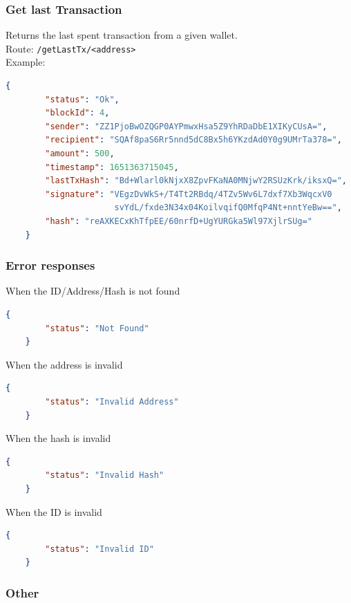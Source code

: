 \documentclass[../documentation.tex]{subfiles}
\begin{document}
\subsubsection{Get last Transaction}

Returns the last spent transaction from a given wallet.
\\
Route: \texttt{/getLastTx/<address>}
\\
Example:
\begin{lstlisting}[language=json]
    {
        "status": "Ok",
        "blockId": 4,
        "sender": "ZZ1PjoBwOZQGP0AYPmwxHsa5Z9YhRDaDbE1XIKyCUsA=",
        "recipient": "SQAf8paS6Rr5nnd5dC8Bx5h6YKzdAd0Y0g9UMrTa378=",
        "amount": 500,
        "timestamp": 1651363715045,
        "lastTxHash": "Bd+Wlarl0kNjxX8ZpvFKaNA0MNjwY2RSUzKrk/iksxQ=",
        "signature": "VEgzDvWkS+/T4Tt2RBdq/4TZv5Wv6L7dxf7Xb3WqcxV0
                      svYdL/fxde3N34x04KoilvqifQ0MfqP4Nt+nntYeBw==",
        "hash": "reAXKECxKhTfpEE/60nrfD+UgYURGka5Wl97XjlrSUg="
    }
\end{lstlisting}

\subsubsection{Error responses}

When the ID/Address/Hash is not found

\begin{lstlisting}[language=json]
    {
        "status": "Not Found"
    }
\end{lstlisting}

When the address is invalid

\begin{lstlisting}[language=json]
    {
        "status": "Invalid Address"
    }
\end{lstlisting}

When the hash is invalid

\begin{lstlisting}[language=json]
    {
        "status": "Invalid Hash"
    }
\end{lstlisting}

When the ID is invalid

\begin{lstlisting}[language=json]
    {
        "status": "Invalid ID"
    }
\end{lstlisting}

\subsubsection{Other}
\end{document}

